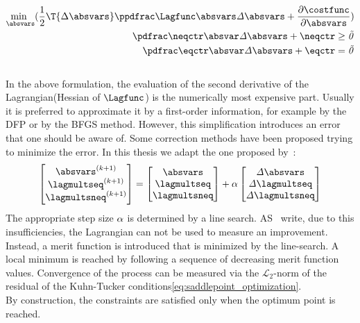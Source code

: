 \documentclass[../main.tex]{subfiles}
\begin{document}
\begin{align}
\underset{\absvars}{\text{min }}( \frac{1}{2} \T{\incrabsvars} \it{\PPLagfuncBYabsvars} \incrabsvars + \frac{\partial \it{\costfunc}}{\partial \absvars} ) \label{eq:quadratic_minimization_problem_1}\\
\it{\PneqctrBYabsvars} \incrabsvars+\it{\neqctr} \geq \vec{0} \label{eq:quadratic_minimization_problem_2}\\
\it{\PeqctrBYabsvars} \incrabsvars+\it{\eqctr} = \vec{0} \label{eq:quadratic_minimization_problem_3}
\end{align}
\\
In the above formulation, the evaluation of the second derivative of the Lagrangian(Hessian of $\Lagfunc$) is the numerically most expensive part. Usually it is preferred to approximate it by a first-order information, for example by the \ac{DFP} or by the \ac{BFGS} method. However, this simplification introduces an error that one should be aware of. Some correction methods have been proposed trying to minimize the error. In this thesis we adapt the one proposed by~\cite{Maute2001}:
\begin{align}\label{eq:correction_step}
\begin{bmatrix}
\absvars^{(k+1)} \\
\lagmultseq^{(k+1)} \\
\lagmultsneq^{(k+1)}
\end{bmatrix} =
  \begin{bmatrix}
  \it{\absvars} \\
  \it{\lagmultseq} \\
  \it{\lagmultsneq} \\
  \end{bmatrix} +
    \it{\alpha}
    \begin{bmatrix}
    \it{\incrabsvars} \\
    \it{\incrlagmultseq} \\
    \it{\incrlagmultsneq} \\
    \end{bmatrix}
\end{align}
The appropriate step size $\it{\alpha}$ is determined by a line search. AS~\cite{Maute2001} write, due to this insufficiencies, the Lagrangian can not be used to measure an improvement. Instead, a merit function is introduced that is minimized by the line-search. A local minimum is reached by following a sequence of decreasing merit function values. Convergence of the process can be measured via the $\mathcal{L}_2$-norm of the residual of the Kuhn-Tucker conditions\eqref{eq:saddlepoint_optimization}.\\
By construction, the constraints are satisfied only when the optimum point is reached.
\end{document}
